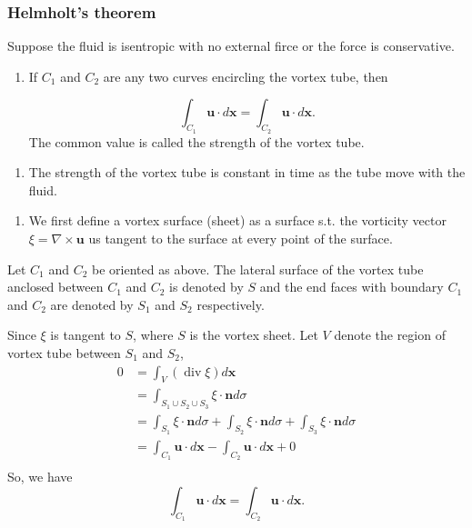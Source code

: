 \subsubsection{Helmholt's theorem} %

Suppose the fluid is isentropic with no external firce or the force is conservative.

\begin{enumerate}
	\item If $C_1$ and $C_2$ are any two curves encircling the vortex tube, then

\begin{equation}
\int_{C_1} \textbf{u} \cdot d\textbf{x} = \int_{C_2} \textbf{u} \cdot d\textbf{x}.
\end{equation}
    The common value is called the strength of the vortex tube.

\end{enumerate}
\begin{enumerate}
	\item The strength of the vortex tube is constant in time as the tube move with the fluid.

\end{enumerate}

\begin{enumerate}
	\item We first define a vortex surface (sheet) as a surface s.t. the vorticity vector $\xi = \nabla\times\textbf{u}$ us tangent to the surface at every point of the surface.

\end{enumerate}
    Let $C_1$ and $C_2$ be oriented as above. The lateral surface of the vortex tube  anclosed between $C_1$ and $C_2$ is denoted by $S$ and the end faces with boundary $C_1$ and $C_2$ are denoted by $S_1$ and $S_2$ respectively.

    Since $\xi$ is tangent to $S$, where $S$ is the vortex sheet. Let $V$ denote the region of vortex tube between $S_1$ and $S_2$,
\begin{equation}
\begin{aligned}
0 &= \int_{V}(\operatorname{div}\xi)d\textbf{x}\\
&= \int_{S_1\cup S_2\cup S_3} \xi\cdot\textbf{n}d\sigma\\
&= \int_{S_1}\xi\cdot\textbf{n}d\sigma
+ \int_{S_2}\xi\cdot\textbf{n}d\sigma
+ \int_{S_3}\xi\cdot\textbf{n}d\sigma\\
&= \int_{C_1}\textbf{u}\cdot d\textbf{x}
- \int_{C_2}\textbf{u}\cdot d\textbf{x}
+ 0\\
\end{aligned}
\end{equation}
    So, we have 
\begin{equation}
\int_{C_1} \textbf{u} \cdot d\textbf{x} = \int_{C_2} \textbf{u} \cdot d\textbf{x}.
\end{equation}


